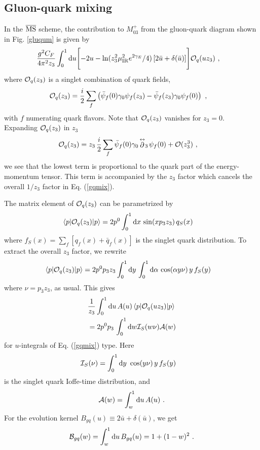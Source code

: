 \subsection{Gluon-quark mixing}

In the $\overline{\rm MS}$ scheme, the contribution to $M_{03} ^+$ from the gluon-quark diagram shown in Fig. \ref{gluqum}
is given by
\begin{align}
& \frac{g^2 C_F}{4\pi^2 z_3} \int_0^1 \mathrm{d} u
\Biggl [ -2u - \ln(z_3^2 \mu_{\rm IR}^2 e^{2\gamma_E}/4) \left[2\bar u+\delta(\bar u) \right] \Biggr ] {\cal O}_q (uz_3) \ ,
\label{gqmix}
\end{align}
where ${\cal O}_q (z_3)$ is a singlet combination of quark fields,
\begin{align}
& {\cal O}_q (z_3)= \frac{i}{2} \sum_f \left(\bar\psi_f( 0) \gamma_0 \psi_f (z_3) - \bar\psi_f( z_3) \gamma_0 \psi_f(0) \right) \ ,
\label{gsing}
\end{align}
with $f$ numerating quark flavors.
Note that ${\cal O}_q (z_3)$ vanishes
for $z_3=0$.
Expanding ${\cal O}_q (z_3)$ in $z_3$
\begin{align}
& {\cal O}_q ( z_3)= z_3\, \frac{i}{2} \sum_f \bar\psi_f( 0)\gamma_0 \!\stackrel{\leftrightarrow}{\partial}_3\! \psi_f(0) + {\cal O} (z_3^3) \ ,
\label{gsingb}
\end{align}
we see that the lowest term is proportional to the quark part of the energy-momentum tensor.
This term is accompanied by the $z_3$ factor which cancels the overall $1/z_3$ factor in Eq. (\ref{gqmix}).

The matrix element of ${\cal O}_q ( z_3)$ can be parametrized by
\begin{align}
& \langle p| {\cal O}_q ( z_3) |p\rangle = 2 p^0
\int_0^1 \mathrm{d} x \, \sin (x p_3 z_3) \, q_S (x)
\label{qpar}
\end{align}
where $f_S (x) = \sum_f [q_f (x) +\bar q_f (x)]$ is the singlet quark distribution.
To extract the overall $z_3$ factor, we rewrite
\begin{align}
& \langle p| {\cal O}_q ( z_3) |p\rangle
= 2 p^0 p_3 z_3
\int_0^1 \mathrm{d} y \, \int_0^1 \mathrm{d} \alpha\, \cos (\alpha y \nu) \, y \, f_S (y )
\label{qpar2}
\end{align}
where $\nu = p_3 z_3$, as usual. This gives
\begin{align}
&\frac1{z_3} \int_0^1 \mathrm{d} u \, A(u) \, \langle p| {\cal O}_q (u z_3) |p\rangle
\nonumber \\  &
= 2 p^0 p_3 \, \int_0^1 \mathrm{d} w {\cal I}_S (w \nu) {\cal A} (w)
\label{qpar3}
\end{align}
for $u$-integrals of Eq. (\ref{gqmix}) type. Here
\begin{align}
& {\cal I}_S (\nu) =
\int_0^1 \mathrm{d} y \ \cos (y \nu) \, y\, f_S (y)
\label{MS}
\end{align}
is the singlet quark Ioffe-time distribution, and
\begin{align}
{\cal A} (w)=
\int_w^1 \mathrm{d} u \, A(u) \ .
\label{Aw}
\end{align}
For the evolution kernel $B_{gq} (u) \equiv 2\bar u+\delta(\bar u)$, we get
\begin{align}
{\cal B}_{gq} (w)=
\int_w^1 \mathrm{d} u \, B_{gq} (u) = 1+ (1- w)^2 \ .
\label{Bw}
\end{align}

